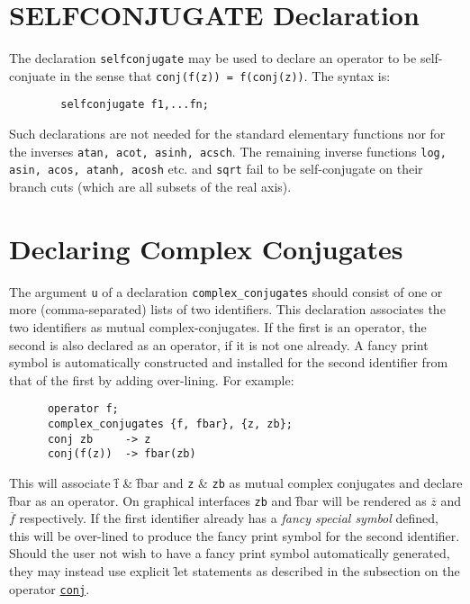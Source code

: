 \section{SELFCONJUGATE Declaration}
\hypertarget{command:SELFCONJUGATE}{}

The declaration \texttt{selfconjugate} may be used 
to declare an operator to be self-conjuate in the sense that
\texttt{conj(f(z)) = f(conj(z))}. The syntax is:
\begin{verbatim}
        selfconjugate f1,...fn;
\end{verbatim}

Such declarations are not needed for the standard elementary functions nor
for the inverses \texttt{atan, acot, asinh, acsch}. The remaining inverse
functions \texttt{log, asin, acos, atanh, acosh} etc. and
\texttt{sqrt} fail to be self-conjugate on their branch cuts (which are all
subsets of the real axis).

\section{Declaring Complex Conjugates}
\hypertarget{command:COMPLEX_CONJUGATES}{}
The argument \texttt{u} of a declaration \texttt{complex\_conjugates} should
consist of one or more (comma-separated) lists of two identifiers.
This declaration associates the two identifiers as
mutual complex-conjugates. If the first is an operator, the second is
also declared as an operator, if it is not one already. A fancy print symbol 
is automatically constructed and installed for the second identifier
from that of the first by adding over-lining. For example:
\begin{verbatim} 
      operator f;
      complex_conjugates {f, fbar}, {z, zb};
      conj zb     -> z
      conj(f(z))  -> fbar(zb)  
\end{verbatim}
This will associate \f{f} \& \f{fbar} and \texttt{z} \& \texttt{zb}
as mutual complex conjugates and declare \f{fbar} as an operator.
On graphical interfaces \texttt{zb} and \f{fbar} will be rendered as
$\overline{z}$ and $\overline{f}$ respectively. If the first identifier
already has a \emph{fancy special symbol} defined, this will be over-lined
to produce the fancy print symbol for the second identifier.
Should the user not wish to have a fancy print symbol automatically generated,
they may instead use explicit \f{let} statements as described in the 
subsection on the operator \hyperlink{operator:CONJ}{\texttt{conj}}.

